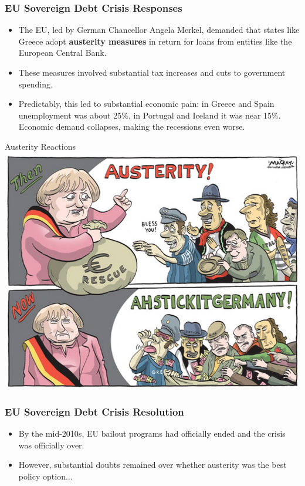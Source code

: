 \documentclass{beamer}
\begin{document}
\begin{frame} 
	\frametitle{\LARGE{EU Sovereign Debt Crisis Responses}}
	
	\begin{itemize}
		\item The EU, led by German Chancellor Angela Merkel, demanded that states like Greece adopt \textbf{austerity measures} in return for loans from entities like the European Central Bank. \pause
		\item These measures involved substantial tax increases and cuts to government spending. \pause
		\item Predictably, this led to substantial economic pain: in Greece and Spain unemployment was about 25\%, in Portugal and Iceland it was near 15\%. Economic demand collapses, making the recessions even worse.
	\end{itemize}
\end{frame}

\begin{frame}{\LARGE Austerity Reactions}
	\centering
	\includegraphics[width=\textwidth,height=\textheight,keepaspectratio]{Austeritycartoon.jpg}
\end{frame}

\begin{frame} 
	\frametitle{\LARGE{EU Sovereign Debt Crisis Resolution}}
	\begin{itemize}
		\item By the mid-2010s, EU bailout programs had officially ended and the crisis was officially over. \pause
		\item However, substantial doubts remained over whether austerity was the best policy option...
	\end{itemize}
\end{frame}
\end{document}
